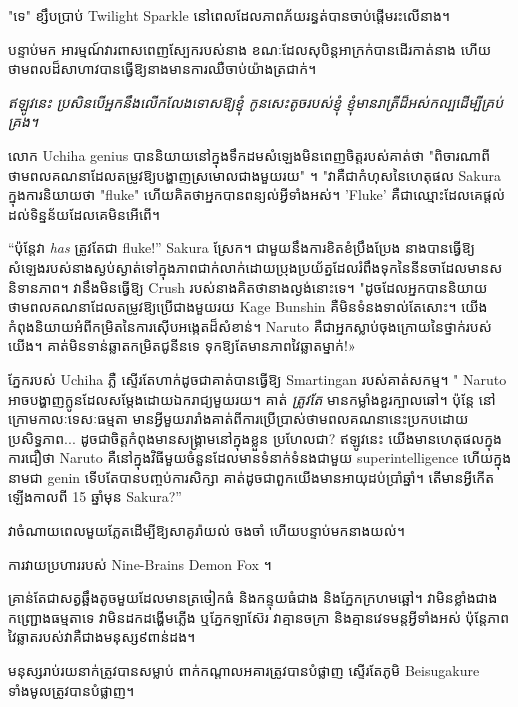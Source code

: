 "ទេ" ខ្សឹបប្រាប់ Twilight Sparkle នៅពេលដែលភាពភ័យរន្ធត់បានចាប់ផ្តើមរះលើនាង។

បន្ទាប់មក អារម្មណ៍វារពាសពេញស្បែករបស់នាង ខណៈដែលសុបិន្តអាក្រក់បានដើរកាត់នាង ហើយថាមពលដ៏សាហាវបានធ្វើឱ្យនាងមានការឈឺចាប់យ៉ាងត្រជាក់។

\emph{ឥឡូវនេះ ប្រសិនបើអ្នកនឹងលើកលែងទោសឱ្យខ្ញុំ កូនសេះតូចរបស់ខ្ញុំ ខ្ញុំមានរាត្រីដ៏អស់កល្បដើម្បីគ្រប់គ្រង។}

\clearpage
{}

លោក Uchiha genius បាននិយាយនៅក្នុងទឹកដមសំឡេងមិនពេញចិត្តរបស់គាត់ថា "ពិចារណាពីថាមពលគណនាដែលតម្រូវឱ្យបង្ហាញស្រមោលជាងមួយរយ" ។ "វាគឺជាកំហុសនៃហេតុផល Sakura ក្នុងការនិយាយថា "fluke" ហើយគិតថាអ្នកបានពន្យល់អ្វីទាំងអស់។ 'Fluke' គឺ​ជា​ឈ្មោះ​ដែល​គេ​ផ្តល់​ដល់​ទិន្នន័យ​ដែល​គេ​មិន​អើពើ។

“ប៉ុន្តែវា \emph{has} ត្រូវតែជា fluke!” Sakura ស្រែក។ ជាមួយនឹងការខិតខំប្រឹងប្រែង នាងបានធ្វើឱ្យសំឡេងរបស់នាងស្ងប់ស្ងាត់ទៅក្នុងភាពជាក់លាក់ដោយប្រុងប្រយ័ត្នដែលរំពឹងទុកនៃនីនចាដែលមានសនិទានភាព។ វានឹងមិនធ្វើឱ្យ Crush របស់នាងគិតថានាងល្ងង់នោះទេ។ "ដូចដែលអ្នកបាននិយាយ ថាមពលគណនាដែលតម្រូវឱ្យប្រើជាងមួយរយ Kage Bunshin គឺមិនទំនងទាល់តែសោះ។ យើង​កំពុង​និយាយ​អំពី​កម្រិត​នៃ​ការ​ស៊ើប​អង្កេត​ដ៏​សំខាន់។ Naruto គឺជាអ្នកស្លាប់ចុងក្រោយនៃថ្នាក់របស់យើង។ គាត់​មិន​ទាន់​ឆ្លាត​កម្រិត​ជូនីន​ទេ ទុក​ឱ្យ​តែ​មាន​ភាព​វៃឆ្លាត​ម្នាក់!»

ភ្នែករបស់ Uchiha ភ្លឺ ស្ទើរតែហាក់ដូចជាគាត់បានធ្វើឱ្យ Smartingan របស់គាត់សកម្ម។ " Naruto អាចបង្ហាញក្លូនដែលសម្តែងដោយឯករាជ្យមួយរយ។ គាត់ \emph{ត្រូវតែ} មានកម្លាំងខួរក្បាលឆៅ។ ប៉ុន្តែ នៅក្រោមកាលៈទេសៈធម្មតា មានអ្វីមួយរារាំងគាត់ពីការប្រើប្រាស់ថាមពលគណនានេះប្រកបដោយប្រសិទ្ធភាព... ដូចជាចិត្តកំពុងមានសង្រ្គាមនៅក្នុងខ្លួន ប្រហែលជា? ឥឡូវនេះ យើងមានហេតុផលក្នុងការជឿថា Naruto គឺនៅក្នុងវិធីមួយចំនួនដែលមានទំនាក់ទំនងជាមួយ superintelligence ហើយក្នុងនាមជា genin ទើបតែបានបញ្ចប់ការសិក្សា គាត់ដូចជាពួកយើងមានអាយុដប់ប្រាំឆ្នាំ។ តើមានអ្វីកើតឡើងកាលពី 15 ឆ្នាំមុន Sakura?”

វាចំណាយពេលមួយភ្លែតដើម្បីឱ្យសាគូរ៉ាយល់ ចងចាំ ហើយបន្ទាប់មកនាងយល់។

ការវាយប្រហាររបស់ Nine-Brains Demon Fox ។

គ្រាន់តែជាសត្វឆ្អឹងតូចមួយដែលមានត្រចៀកធំ និងកន្ទុយធំជាង និងភ្នែកក្រហមឆ្អៅ។ វា​មិន​ខ្លាំង​ជាង​កញ្ជ្រោង​ធម្មតា​ទេ វា​មិន​ដកដង្ហើម​ភ្លើង ឬ​ភ្នែក​ឡាស៊ែរ វា​គ្មាន​ចក្រា និង​គ្មាន​វេទមន្ត​អ្វី​ទាំងអស់ ប៉ុន្តែ​ភាព​វៃឆ្លាត​របស់​វា​គឺ​ជាង​មនុស្ស​៩​ពាន់​ដង​។

មនុស្សរាប់រយនាក់ត្រូវបានសម្លាប់ ពាក់កណ្តាលអគារត្រូវបានបំផ្លាញ ស្ទើរតែភូមិ Beisugakure ទាំងមូលត្រូវបានបំផ្លាញ។

